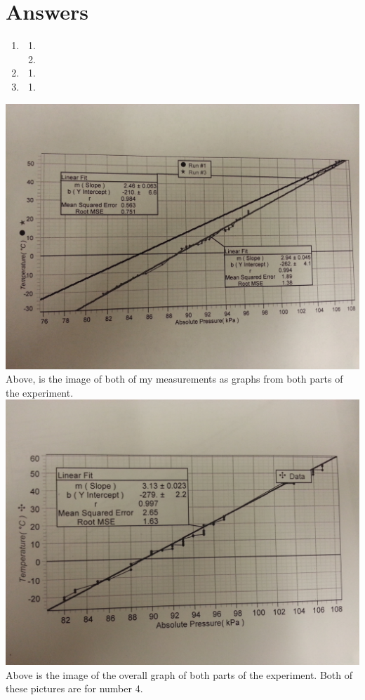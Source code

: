\documentclass[12pt]{report}
\begin{document}
\section{Answers}
	\begin{enumerate}
		\item 
		\begin{enumerate}
			\item
			\item 
		\end{enumerate}
		\item
		\begin{enumerate}
			\item
		\end{enumerate}
		\item
		\begin{enumerate}
			\item
			
		\end{enumerate}
\end{enumerate}
\includegraphics[scale=0.2]{both_graphs}
Above, is the image of both of my measurements as graphs from both parts of the experiment.\\
\includegraphics[scale=0.2]{OverallGraphs}
Above is the image of the overall graph of both parts of the experiment.
Both of these pictures are for number 4.
\end{document}
